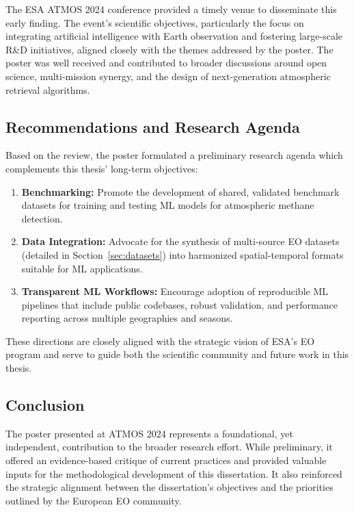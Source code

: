 The ESA ATMOS 2024 conference provided a timely venue to disseminate this early finding. The event’s scientific objectives, particularly the focus on integrating artificial intelligence with Earth observation and fostering large-scale R\&D initiatives, aligned closely with the themes addressed by the poster. The poster was well received and contributed to broader discussions around open science, multi-mission synergy, and the design of next-generation atmospheric retrieval algorithms.

\subsection{Recommendations and Research Agenda}

Based on the review, the poster formulated a preliminary research agenda which complements this thesis’ long-term objectives:

\begin{enumerate}
	\item \textbf{Benchmarking:} Promote the development of shared, validated benchmark datasets for training and testing ML models for atmospheric methane detection.
	\item \textbf{Data Integration:} Advocate for the synthesis of multi-source EO datasets (detailed in Section~\ref{sec:datasets}) into harmonized spatial-temporal formats suitable for ML applications.
	\item \textbf{Transparent ML Workflows:} Encourage adoption of reproducible ML pipelines that include public codebases, robust validation, and performance reporting across multiple geographies and seasons.
\end{enumerate}

These directions are closely aligned with the strategic vision of ESA’s EO program and serve to guide both the scientific community and future work in this thesis.

\subsection{Conclusion}

The poster presented at ATMOS 2024 represents a foundational, yet independent, contribution to the broader research effort. While preliminary, it offered an evidence-based critique of current practices and provided valuable inputs for the methodological development of this dissertation. It also reinforced the strategic alignment between the dissertation's objectives and the priorities outlined by the European EO community.

